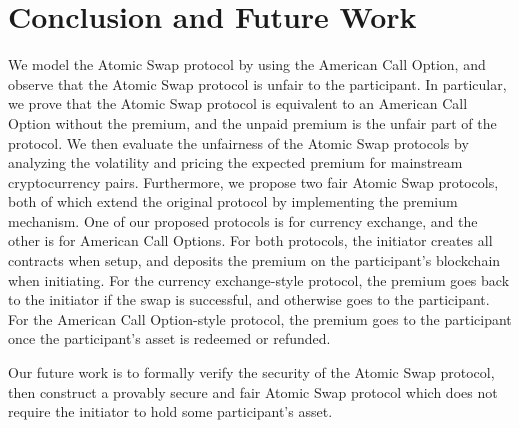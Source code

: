 \section{Conclusion and Future Work}
\label{sec:conclusion}


We model the Atomic Swap protocol by using the American Call Option,
and observe that the Atomic Swap protocol is unfair to the participant.
In particular, we prove that the Atomic Swap protocol is equivalent to an American Call Option without the premium,
and the unpaid premium is the unfair part of the protocol.
We then evaluate the unfairness of the Atomic Swap protocols by analyzing the volatility and pricing the expected premium for mainstream cryptocurrency pairs.
Furthermore, we propose two fair Atomic Swap protocols, both of which extend the original protocol by implementing the premium mechanism.
One of our proposed protocols is for currency exchange, and the other is for American Call Options.
For both protocols, the initiator creates all contracts when setup, and deposits the premium on the participant's blockchain when initiating.
For the currency exchange-style protocol, the premium goes back to the initiator if the swap is successful, and otherwise goes to the participant.
For the American Call Option-style protocol, the premium goes to the participant once the participant's asset is redeemed or refunded.

Our future work is to formally verify the security of the Atomic Swap protocol,
then construct a provably secure and fair Atomic Swap protocol which does not require the initiator to hold some participant's asset.
